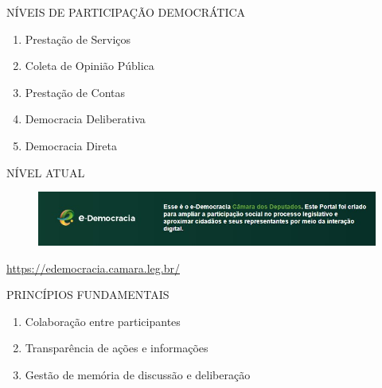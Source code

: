 \documentclass{Alexandre}
\begin{document}
\begin{frame}{NÍVEIS DE PARTICIPAÇÃO DEMOCRÁTICA}

    \begin{enumerate}
        \item Prestação de Serviços 
        \item Coleta de Opinião Pública 
        \item Prestação de Contas 
        \item Democracia Deliberativa 
        \item Democracia Direta
    \end{enumerate}

\end{frame}


\begin{frame}{NÍVEL ATUAL}

    \begin{figure}
        \includegraphics[scale = 0.50]{Figuras/eDemocracia.jpg}
    \end{figure}
    \begin{center}
        \url{https://edemocracia.camara.leg.br/}
    \end{center}

\end{frame}


\begin{frame}{PRINCÍPIOS FUNDAMENTAIS}

    \begin{enumerate}
        \item Colaboração entre participantes 
        \item Transparência de ações e informações 
        \item Gestão de memória de discussão e deliberação
    \end{enumerate}

\end{frame}
\end{document}
